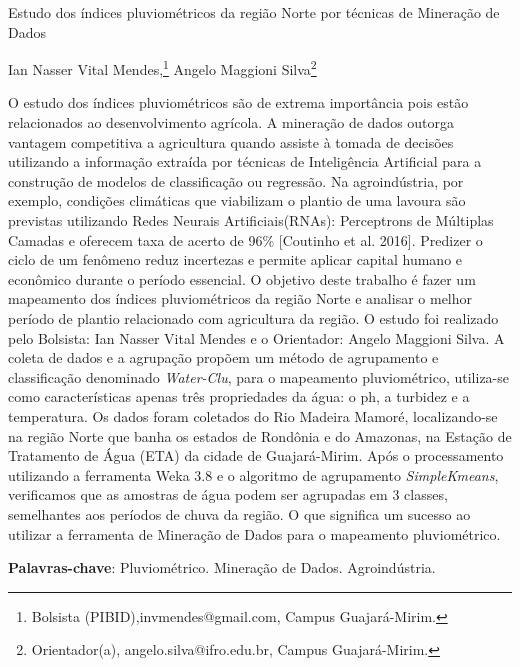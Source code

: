 \documentclass[article,12pt,onesidea,4paper,english,brazil]{abntex2}
\begin{document}
	
	
	\frenchspacing 
	
	\begin{center}
		\LARGE Estudo dos índices pluviométricos da região Norte por técnicas de Mineração de Dados
		
		\normalsize
	Ian Nasser Vital Mendes,\footnote{Bolsista (PIBID),invmendes@gmail.com, Campus Guajará-Mirim.} 
		Angelo Maggioni Silva\footnote{Orientador(a), angelo.silva@ifro.edu.br, Campus Guajará-Mirim.} 
		
	\end{center}
	
	\noindent O estudo dos índices pluviométricos são de extrema importância pois estão relacionados ao desenvolvimento agrícola. A mineração de dados outorga vantagem competitiva a agricultura quando assiste à tomada de decisões utilizando a informação extraída por técnicas de Inteligência Artificial para a construção de modelos de classificação ou regressão. Na agroindústria, por exemplo, condições climáticas que viabilizam o plantio de uma lavoura são previstas utilizando Redes Neurais Artificiais(RNAs): Perceptrons de Múltiplas Camadas e oferecem taxa de acerto de 96\% [Coutinho et al. 2016]. Predizer o ciclo de um fenômeno reduz incertezas e permite aplicar capital humano e econômico durante o período essencial. O objetivo deste trabalho é fazer um mapeamento dos índices pluviométricos da região Norte e analisar o melhor período de plantio relacionado com agricultura da região. O estudo foi realizado pelo Bolsista: Ian Nasser Vital Mendes e o Orientador: Angelo Maggioni Silva. A coleta de dados e a agrupação propõem um método de agrupamento e classificação denominado \textit{Water-Clu}, para o mapeamento pluviométrico, utiliza-se como características apenas três propriedades da água: o ph, a turbidez e a temperatura. Os dados foram coletados do Rio Madeira Mamoré, localizando-se na região Norte que banha os estados de Rondônia e do Amazonas, na Estação de Tratamento de Água (ETA) da cidade de Guajará-Mirim. Após o processamento utilizando a ferramenta Weka 3.8 e o algoritmo de agrupamento \textit{SimpleKmeans}, verificamos que as amostras de água podem ser agrupadas em 3 classes, semelhantes aos períodos de chuva da região. O que significa um sucesso ao utilizar a ferramenta de Mineração de Dados para o mapeamento pluviométrico.
	
	\vspace{\onelineskip}
	
	\noindent
	\textbf{Palavras-chave}: Pluviométrico. Mineração de Dados. Agroindústria.
	
\end{document}
